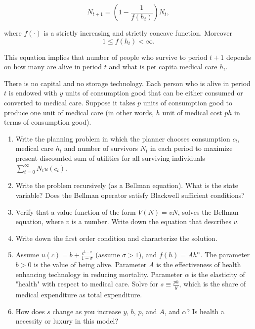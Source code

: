 \documentclass[10pt, a4paper]{article}
\begin{document}
    \[N_{t+1} = \left(1 - \frac{1}{f(h_t)}\right)N_t,\]

    where $f(\cdot)$ is a strictly increasing and strictly concave function. Moreover
    \[1 \leq f(h_t) < \infty.\]

    This equation implies that number of people who survive to period $t + 1$ depends on how many are alive in period $t$ and what is per capita medical care $h_t$.

    There is no capital and no storage technology. Each person who is alive in period $t$ is endowed with $y$ units of consumption good that can be either consumed or converted to medical care. Suppose it takes $p$ units of consumption good to produce one unit of medical care (in other words, $h$ unit of medical cost $ph$ in terms of consumption good).

    \begin{enumerate}
    \item Write the planning problem in which the planner chooses consumption $c_t$, medical care $h_t$ and number of survivors $N_t$ in each period to maximize present discounted sum of utilities for all surviving individuals $\sum_{t=0}^{\infty} N_t u(c_t)$.

    \item Write the problem recursively (as a Bellman equation). What is the state variable? Does the Bellman operator satisfy Blackwell sufficient conditions?

    \item Verify that a value function of the form $V(N) = vN$, solves the Bellman equation, where $v$ is a number. Write down the equation that describes $v$.

    \item Write down the first order condition and characterize the solution.

    \item Assume $u(c) = b + \frac{c^{1-\sigma}}{1-\sigma}$ (assume $\sigma > 1$), and $f(h) = Ah^\alpha$. The parameter $b > 0$ is the value of being alive. Parameter $A$ is the effectiveness of health enhancing technology in reducing mortality. Parameter $\alpha$ is the elasticity of "health" with respect to medical care. Solve for $s \equiv \frac{ph}{y}$, which is the share of medical expenditure as total expenditure.

    \item How does $s$ change as you increase $y$, $b$, $p$, and $A$, and $\alpha$? Is health a necessity or luxury in this model?
    \end{enumerate}
\end{document}
